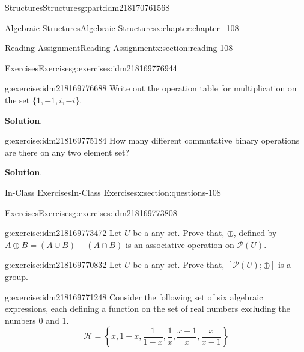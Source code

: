 \documentclass[oneside,10pt,]{book}
\newcommand{\blocktitlefont}{\relax}
\numberwithin{equation}{section}
\begin{document}
\begin{partptx}{Structures}{}{Structures}{}{}{g:part:idm218170761568}
\begin{chapterptx}{Algebraic Structures}{}{Algebraic Structures}{}{}{x:chapter:chapter_108}
\begin{sectionptx}{Reading Assignment}{}{Reading Assignment}{}{}{x:section:reading-108}
\begin{exercises-subsection-numberless}{Exercises}{}{Exercises}{}{}{g:exercises:idm218169776944}
\begin{exercisegroup}
\begin{divisionexerciseeg}{1}{}{}{g:exercise:idm218169776688}
Write out the operation table for multiplication on the set \(\{1,-1,i, -i\}\).%
\par\smallskip%
\noindent\textbf{\blocktitlefont Solution}.\hypertarget{g:solution:idm218169775440}{}\quad{}%
\end{divisionexerciseeg}%
\begin{divisionexerciseeg}{2}{}{}{g:exercise:idm218169775184}%
How many different commutative binary operations are there on any two element set?%
\par\smallskip%
\noindent\textbf{\blocktitlefont Solution}.\hypertarget{g:solution:idm218169775856}{}\quad{}%
\end{divisionexerciseeg}%
\end{exercisegroup}
\par\medskip\noindent
\end{exercises-subsection-numberless}
\end{sectionptx}
%
%
\typeout{************************************************}
\typeout{************************************************}
%
\begin{sectionptx}{In-Class Exercises}{}{In-Class Exercises}{}{}{x:section:questions-108}
%
%
%
\typeout{************************************************}
\typeout{************************************************}
%
\begin{exercises-subsection-numberless}{Exercises}{}{Exercises}{}{}{g:exercises:idm218169773808}
\par\medskip\noindent%
%
\begin{exercisegroup}
\begin{divisionexerciseeg}{1}{}{}{g:exercise:idm218169773472}%
Let \(U\) be a any set.  Prove that, \(\oplus\), defined by \(A \oplus  B = (A \cup  B) - (A \cap  B)\) is an associative operation on \(\mathcal{P}(U)\).%
\end{divisionexerciseeg}%
\begin{divisionexerciseeg}{2}{}{}{g:exercise:idm218169770832}%
Let \(U\) be a any set.  Prove that,   \([\mathcal{P}(U); \oplus]\) is a group.%
\end{divisionexerciseeg}%
\begin{divisionexerciseeg}{3}{}{}{g:exercise:idm218169771248}%
Consider the following set of six  algebraic expressions, each defining a function on the set of real numbers excluding the numbers 0 and 1.%
\begin{equation*}
\mathcal{H}=\left\{x,1-x,\frac{1}{1-x},\frac{1}{x},\frac{x-1}{x},\frac{x}{x-1}\right\}

\end{equation*}
\end{divisionexerciseeg}
\end{exercisegroup}
\end{exercises-subsection-numberless}
\end{sectionptx}
\end{chapterptx}
\end{partptx}
\end{document}
